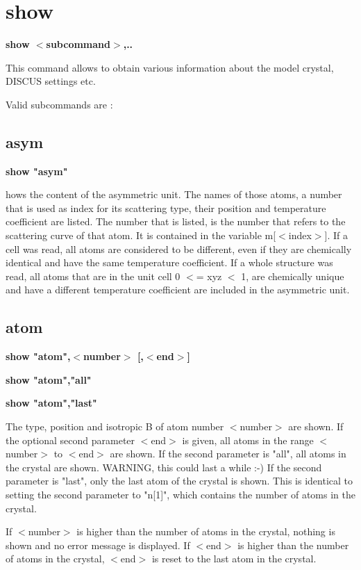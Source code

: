 \section{show}
{\bf show $ <$subcommand$> $,.. \par }
\par
\vspace{3pt}
This command allows to obtain various information about the 
model crystal, DISCUS settings etc. 
\par
Valid subcommands are : 
\par
\subsection*{asym}
{\bf show "asym" \par }
\par
\vspace{3pt}
hows the content of the asymmetric unit. The names of those atoms, 
a number that is used as index for its scattering type, their position 
and temperature coefficient are listed. The number that is listed, 
is the number that refers to the scattering curve of that atom. It is 
contained in the variable m[$ <$index$> $]. If a cell was read, all atoms 
are considered to be different, even if they are chemically identical 
and have the same temperature coefficient. If a whole structure was 
read, all atoms that are in the unit cell 0 $ <$= xyz $ <$ 1, are chemically 
unique and have a different temperature coefficient are included in 
the asymmetric unit. 
\subsection*{atom}
{\bf show "atom",$ <$number$> $ [,$ <$end$> $] \par }
{\bf show "atom","all" \par }
{\bf show "atom","last" \par }
\par
\vspace{3pt}
The type, position and isotropic B of atom number $ <$number$> $ are shown. 
If the optional second parameter $ <$end$> $ is given, all atoms in the 
range $ <$number$> $ to $ <$end$> $ are shown. 
If the second parameter is "all", all atoms in the crystal are shown. 
WARNING, this could last a while :-) 
If the second parameter is "last", only the last atom of the crystal 
is shown. This is identical to setting the second parameter to "n[1]", 
which contains the number of atoms in the crystal. 
\par
If $ <$number$> $ is higher than the number of atoms in the crystal, nothing 
is shown and no error message is displayed. 
If $ <$end$> $ is higher than the number of atoms in the crystal, $ <$end$> $ is 
reset to the last atom in the crystal. 
